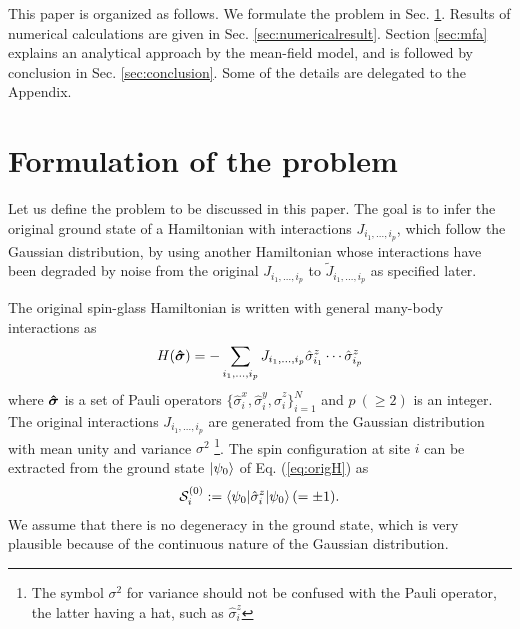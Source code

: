 \documentclass[aps,pra,twocolumn,groupedaddress,longbibliography]{revtex4}
\def\v#1{\mbox{\boldmath $#1$}}
\newcommand{\Sig}{\sigma}
\begin{document}
This paper is organized as follows. We formulate the problem in Sec. \ref{sec:formulation}. Results of numerical calculations are given in Sec. \ref{sec:numericalresult}. Section \ref{sec:mfa} explains an analytical approach by the mean-field model, and is followed by conclusion in Sec. \ref{sec:conclusion}.  Some of the details are delegated to the Appendix.

\section{Formulation of the problem} 
\label{sec:formulation}
Let us define the problem to be discussed in this paper. The goal is to infer the original ground state of a Hamiltonian with interactions $J_{i_1, \ldots, i_p}$, which follow the Gaussian distribution, by using another Hamiltonian whose interactions have been degraded by noise from the original $J_{i_1, \ldots, i_p}$ to $\tilde{J}_{i_1, \ldots, i_p}$ as specified later.

The original spin-glass Hamiltonian is written with general many-body interactions as
\begin{align}
	\label{eq:origH}
	H(\v{\hat{\Sig}}) = -\sum_{i_1, \ldots, i_p}J_{i_1, \ldots, i_p}\hat{\Sig}^z_{i_1}\cdots \hat{\Sig}^z_{i_p}
\end{align}
where $\v{\hat{\Sig}}$ is a set of Pauli operators $\{\hat{\Sig}_i^x,\hat{\Sig}_i^y,\hat{\Sig}_i^z\}_{i=1}^N$ and $p\ (\geq 2)$ is an integer. The original interactions $J_{i_1, \ldots, i_p}$ are generated from the Gaussian distribution with mean unity and variance $\sigma^2$ \footnote{The symbol $\sigma^2$ for variance should not be confused with the Pauli operator, the latter having a hat, such as $\hat{\Sig}_i^z$}. The spin configuration at site $i$ can be extracted from the ground state $\ket{\psi_0}$ of Eq. (\ref{eq:origH}) as
\begin{align}
	\mathcal{S}^{(0)}_i := \braket{\psi_0|\hat{\Sig}^z_i|\psi_0} (=\pm 1).
\end{align}
We assume that there is no degeneracy in the ground state, which is very plausible because of the continuous nature of the Gaussian distribution.
\end{document}
